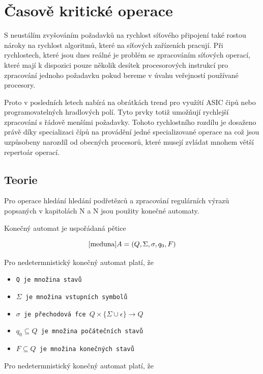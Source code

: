 \section{Časově kritické operace}
S neustálím zvyšováním požadavků na rychlost síťového připojení také rostou nároky na rychlost
algoritmů, které na síťových zařízeních pracují. Při rychlostech, které jsou dnes reálné je problém se zpracováním
síťových operací, které mají k dispozici pouze několik desítek procesorových instrukcí pro zpracování jednoho požadavku
pokud bereme v úvahu veřejností používané procesory.

Proto v posledních letech nabírá na obrátkách trend pro využítí ASIC čipů nebo programovatelných hradlových polí.
Tyto prvky totiž umožňují rychlejší zpracování s řádově menšími požadavky.
Tohoto rychlostního rozdílu je dosaženo právě díky specializaci čípů na provádění jedné specializované operace na což jsou uzpůsobeny
narozdíl od obecných procesorů, které musejí zvládat mnohem větší repertoár operací.

\subsection{Teorie}

Pro operace hledání hledání podřetězců a zpracování regulárních výrazů popsaných v kapitolách N a N
jsou použity konečné automaty.

Konečný automat je uspořádaná pětice

\begin{huge}
\begin{equation}\cite{meduna}
A=(Q,\Sigma, \sigma,q_0 ,F)
\end{equation}
\end{huge}

Pro nedetermnistický konečný automat platí, že
\begin{itemize}
\item{\tt{Q} je množina stavů}
\item{\tt{$\Sigma$} je množina vstupních symbolů}
\item{\tt{$\sigma$} je přechodová fce $Q \times \{\Sigma \cup \epsilon\} \rightarrow Q$}
\item{\tt{$q_0 \subseteq Q$} je množina počátečních stavů}
\item{\tt{$F \subseteq Q$} je množina konečných stavů}
\end{itemize}

Pro nedetermnistický konečný automat platí, že

